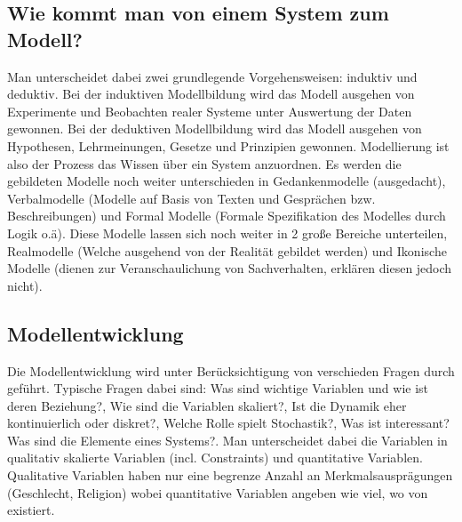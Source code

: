 \documentclass[11pt, fleqn, a4paper, leqno]{scrartcl} %
\begin{document}
	\subsection{Wie kommt man von einem System zum Modell?}
		Man unterscheidet dabei zwei grundlegende Vorgehensweisen: induktiv und deduktiv. Bei der induktiven Modellbildung wird das Modell ausgehen von Experimente und Beobachten realer Systeme unter Auswertung der Daten gewonnen. Bei der deduktiven Modellbildung wird das Modell ausgehen von Hypothesen, Lehrmeinungen, Gesetze und Prinzipien gewonnen. Modellierung ist also der Prozess das Wissen über ein System anzuordnen. Es werden die gebildeten Modelle noch weiter unterschieden in Gedankenmodelle (ausgedacht), Verbalmodelle (Modelle auf Basis von Texten und Gesprächen bzw. Beschreibungen) und Formal Modelle (Formale Spezifikation des Modelles durch Logik o.ä). Diese Modelle lassen sich noch weiter in 2 große Bereiche unterteilen, Realmodelle (Welche ausgehend von der Realität gebildet werden) und Ikonische Modelle (dienen zur Veranschaulichung von Sachverhalten, erklären diesen jedoch nicht).
	\subsection{Modellentwicklung}
		Die Modellentwicklung wird unter Berücksichtigung von verschieden Fragen durch geführt. Typische Fragen dabei sind: Was sind wichtige Variablen und wie ist deren Beziehung?, Wie sind die Variablen skaliert?, Ist die Dynamik eher kontinuierlich oder diskret?, Welche Rolle spielt Stochastik?, Was ist interessant? Was sind die Elemente eines Systems?. Man unterscheidet dabei die Variablen in qualitativ skalierte Variablen (incl. Constraints) und quantitative Variablen. Qualitative Variablen haben nur eine begrenze Anzahl an Merkmalsausprägungen (Geschlecht, Religion) wobei quantitative Variablen angeben wie viel, wo von existiert.
\end{document}
